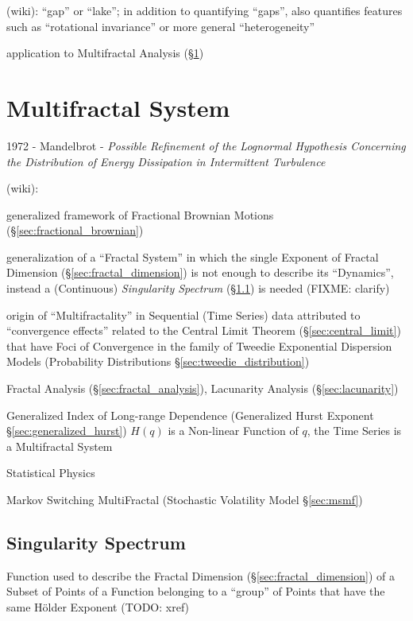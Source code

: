 (wiki): ``gap'' or ``lake''; in addition to quantifying ``gaps'', also
quantifies features such as ``rotational invariance'' or more general
``heterogeneity''

application to Multifractal Analysis (\S\ref{sec:multifractal_system})



\section{Multifractal System}\label{sec:multifractal_system}

1972 - Mandelbrot - \emph{Possible Refinement of the Lognormal Hypothesis
  Concerning the Distribution of Energy Dissipation in Intermittent Turbulence}

(wiki):

generalized framework of Fractional Brownian Motions
(\S\ref{sec:fractional_brownian})

generalization of a ``Fractal System'' in which the single Exponent of Fractal
Dimension (\S\ref{sec:fractal_dimension}) is not enough to describe its
``Dynamics'',  instead a (Continuous) \emph{Singularity Spectrum}
(\S\ref{sec:singularity_spectrum}) is needed (FIXME: clarify)

origin of ``Multifractality'' in Sequential (Time Series) data attributed to
``convergence effects'' related to the Central Limit Theorem
(\S\ref{sec:central_limit}) that have Foci of Convergence in the family of
Tweedie Exponential Dispersion Models (Probability Distributions
\S\ref{sec:tweedie_distribution})

Fractal Analysis (\S\ref{sec:fractal_analysis}), Lacunarity Analysis
(\S\ref{sec:lacunarity})

Generalized Index of Long-range Dependence (Generalized Hurst Exponent
\S\ref{sec:generalized_hurst}) $H(q)$ is a Non-linear Function of $q$, the Time
Series is a Multifractal System

Statistical Physics

\fist Markov Switching MultiFractal (Stochastic Volatility Model
\S\ref{sec:msmf})



\subsection{Singularity Spectrum}\label{sec:singularity_spectrum}

Function used to describe the Fractal Dimension (\S\ref{sec:fractal_dimension})
of a Subset of Points of a Function belonging to a ``group'' of Points that have
the same H\"older Exponent (TODO: xref)
